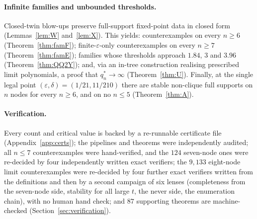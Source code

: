 \documentclass[11pt]{article}
\theoremstyle{definition}
\newcommand{\eps}{\varepsilon}
\begin{document}
\paragraph{Infinite families and unbounded thresholds.} Closed-twin blow-ups preserve full-support
fixed-point data in closed form (Lemmas~\ref{lem:W} and~\ref{lem:X}). This yields: counterexamples on
every $n\ge6$ (Theorem~\ref{thm:famF}); finite-$\eps$-only counterexamples on every $n\ge7$
(Theorem~\ref{thm:famE}); families whose thresholds approach $1.84$, $3$ and $3.96$
(Theorem~\ref{thm:QQ2Y}); and, via an in-tree construction realising prescribed limit polynomials, a proof
that $q_n^*\to\infty$ (Theorem~\ref{thm:U}). Finally, at the single legal point
$(\eps,\delta)=(1/21,11/210)$ there are stable non-clique full supports on $n$ nodes for every
$n\ge6$, and on no $n\le5$ (Theorem~\ref{thm:A}).

\paragraph{Verification.} Every count and critical value is backed by a re-runnable certificate file
(Appendix~\ref{app:certs}); the pipelines and theorems were independently audited; all $n\le7$ counterexamples were
hand-verified, and the $124$ seven-node ones were re-decided by four independently written exact verifiers; the $9{,}133$
eight-node limit counterexamples were re-decided by four further exact verifiers written from the definitions and then by a
second campaign of six lenses (completeness from the seven-node side, stability for all large $t$, the never side, the
enumeration chain), with no human hand check; and $87$ supporting theorems are machine-checked
(Section~\ref{sec:verification}).
\end{document}
